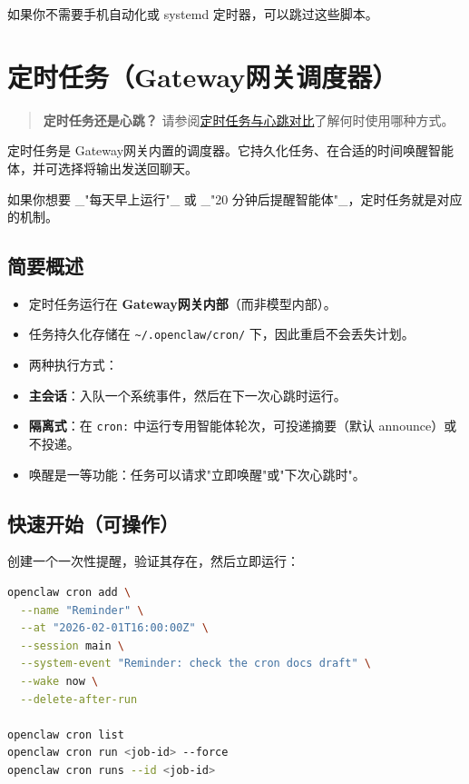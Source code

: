 如果你不需要手机自动化或 systemd 定时器，可以跳过这些脚本。


\clearpage

\section{定时任务（Gateway网关调度器）}


\begin{quote}
\textbf{定时任务还是心跳？} 请参阅\href{/automation/cron-vs-heartbeat}{定时任务与心跳对比}了解何时使用哪种方式。
\end{quote}


定时任务是 Gateway网关内置的调度器。它持久化任务、在合适的时间唤醒智能体，并可选择将输出发送回聊天。

如果你想要 \_"每天早上运行"\_ 或 \_"20 分钟后提醒智能体"\_，定时任务就是对应的机制。

\subsection{简要概述}


\begin{itemize}
  \item 定时任务运行在 \textbf{Gateway网关内部}（而非模型内部）。
  \item 任务持久化存储在 \texttt{\textasciitilde{}/.openclaw/cron/} 下，因此重启不会丢失计划。
  \item 两种执行方式：
  \item \textbf{主会话}：入队一个系统事件，然后在下一次心跳时运行。
  \item \textbf{隔离式}：在 \texttt{cron:} 中运行专用智能体轮次，可投递摘要（默认 announce）或不投递。
  \item 唤醒是一等功能：任务可以请求"立即唤醒"或"下次心跳时"。
\end{itemize}


\subsection{快速开始（可操作）}


创建一个一次性提醒，验证其存在，然后立即运行：

\begin{lstlisting}[language=bash]
openclaw cron add \
  --name "Reminder" \
  --at "2026-02-01T16:00:00Z" \
  --session main \
  --system-event "Reminder: check the cron docs draft" \
  --wake now \
  --delete-after-run

openclaw cron list
openclaw cron run <job-id> --force
openclaw cron runs --id <job-id>
\end{lstlisting}


